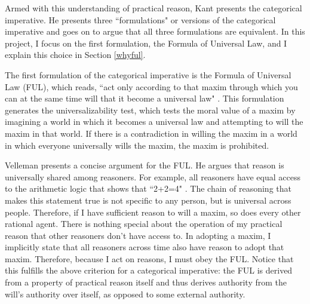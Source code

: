 \begin{isabellebody}
\begin{isamarkuptext}
Armed with this understanding of practical reason, Kant presents the categorical 
imperative. He presents three ``formulations" or versions of the categorical imperative and goes on to 
argue that all three formulations are equivalent. In this project, I focus on the first formulation,
the Formula of Universal Law, and I explain this choice in Section \ref{whyful}.

The first formulation of the categorical imperative is the
Formula of Universal Law (FUL), which reads, ``act only according to that maxim through which you can 
at the same time will that it become a universal law" \cite[34]{groundwork}. This formulation
generates the universalizability test, which tests the moral value of a maxim by 
imagining a world in which it becomes a universal law and attempting to will the maxim in that world.
If there is a contradiction in willing the maxim in a world in which everyone universally wills the maxim,
the maxim is prohibited. 

Velleman presents a concise argument for the FUL. He argues that reason is universally shared among reasoners. For 
example, all reasoners have equal access to the arithmetic logic that shows that ``2+2=4" \cite[29]{velleman}. The chain of 
reasoning that makes this statement true is not specific to any person, but is universal across people. 
Therefore, if I have sufficient reason to will a maxim, so does every other rational agent. There is 
nothing special about the operation of my practical reason that other reasoners don't have access to. 
In adopting a maxim, I implicitly state that all reasoners
across time also have reason to adopt that maxim. Therefore, because I act on reasons, I must obey the 
FUL. Notice that this fulfills the above criterion for a categorical imperative: the FUL is derived from 
a property of practical reason itself and thus derives authority from the will's authority over itself, 
as opposed to some external authority.


\end{isamarkuptext}
\end{isabellebody}
